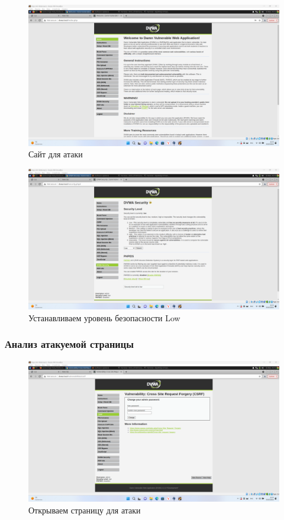 \documentclass[a4paper]{article}
\begin{document}
  \begin{figure}[H]
    \centering
    \includegraphics[width=\textwidth]{Screenshot_87}
    \caption{Сайт для атаки}
  \end{figure}

  \begin{figure}[H]
    \centering
    \includegraphics[width=\textwidth]{Screenshot_88}
    \caption{Устанавливаем уровень безопасности Low}
  \end{figure}

  \subsubsection{Анализ атакуемой страницы}

  \begin{figure}[H]
    \centering
    \includegraphics[width=\textwidth]{Screenshot_89}
    \caption{Открываем страницу для атаки}
  \end{figure}
\end{document}
